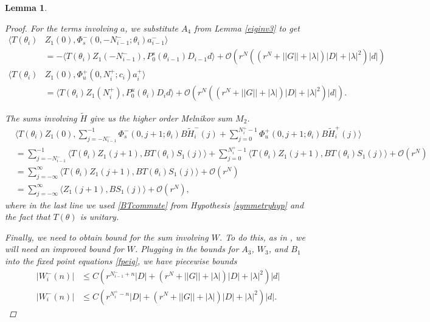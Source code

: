 \documentclass[12pt]{article}
\newtheorem{lemma}{Lemma}
\begin{document}
\begin{lemma}
\begin{proof}
For the terms involving $a$, we substitute $A_4$ from Lemma \ref{eiginv3} to get
\begin{align*}
\langle T(\theta_i) &Z_1(0), \Phi_s^-(0, -N_{i-1}^-; \theta_i) a_{i-1}^- \rangle \\
&= -\langle T(\theta_i) Z_1(-N_{i-1}^-), P_0^s(\theta_{i-1}) D_{i-1} d \rangle + \mathcal{O}\left(r^N( (r^N + ||G|| + |\lambda|)|D| + |\lambda|^2 )|d| \right) \\
\langle T(\theta_i) &Z_1(0), \Phi_u^+(0, N_i^+; c_i) a_i^+ \rangle \\
&= \langle T(\theta_i) Z_1(N_i^+), P_0^u(\theta_i) D_i d \rangle + \mathcal{O}\left(r^N( (r^N + ||G|| + |\lambda|)|D| + |\lambda|^2 )|d| \right).
\end{align*}

The sums involving $\tilde{H}$ give us the higher order Melnikov sum $M_2$.
\begin{align*}
&\langle T(\theta_i) Z_1(0), \sum_{j = -N_{i-1}^-}^{-1} \Phi_s^-(0, j+1; \theta_i) B \tilde{H}_i^-(j) + \sum_{j = 0}^{N_i^+-1} \Phi_u^+(0, j+1; \theta_i) B \tilde{H}_i^+(j) \rangle \\
&= \sum_{j = -N_{i-1}^-}^{-1} \langle T(\theta_i) Z_1(j+1), B T(\theta_i) S_1(j) \rangle + \sum_{j = 0}^{N_i^+-1} \langle T(\theta_i) Z_1(j+1), B T(\theta_i) S_1(j) \rangle + \mathcal{O}(r^N)\\
&= \sum_{j = -\infty}^{\infty} \langle T(\theta_i) Z_1(j+1), B T(\theta_i) S_1(j)\rangle + \mathcal{O}(r^N) \\
&= \sum_{j = -\infty}^{\infty} \langle Z_1(j+1), B S_1(j)\rangle + \mathcal{O}(r^N),
\end{align*}
where in the last line we used \eqref{BTcommute} from Hypothesis \ref{symmetryhyp} and the fact that $T(\theta)$ is unitary.

Finally, we need to obtain bound for the sum involving $W$. To do this, as in \cite{Sandstede1998}, we will need an improved bound for $W$. Plugging in the bounds for $A_3$, $W_3$, and $B_1$ into the fixed point equations \eqref{fpeig}, we have piecewise bounds
\begin{align*}
|W_i^-(n)| &\leq C( r^{N_{i-1}^- + n}|D| +  
(r^N + ||G|| + |\lambda|)|D| + |\lambda|^2 )|d| \\
|W_i^-(n)| &\leq C( r^{N_i^+ - n}|D| +  
(r^N + ||G|| + |\lambda|)|D| + |\lambda|^2 )|d|.
\end{align*}


\end{proof}
\end{lemma}
\end{document}
